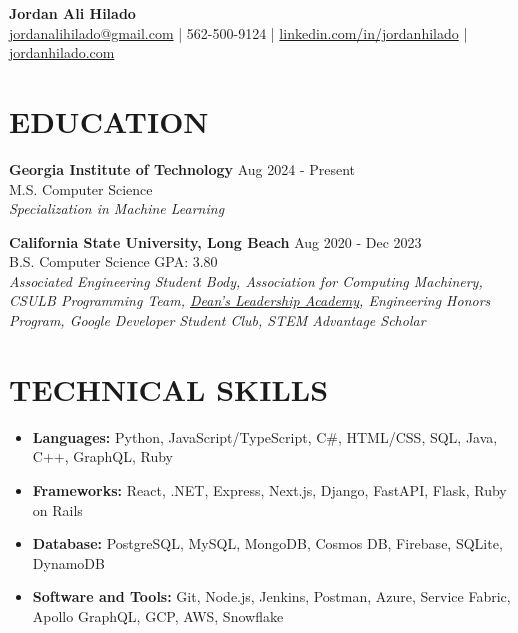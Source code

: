 \documentclass[a4paper,10pt]{extarticle}
\begin{document}
\pagestyle{empty}

\begin{center}
\textbf{\Large Jordan Ali Hilado}\\[2pt] %
\href{mailto:jordanalihilado@gmail.com}{jordanalihilado@gmail.com} | 562-500-9124 | \href{https://www.linkedin.com/in/jordanhilado}{linkedin.com/in/jordanhilado} | \href{https://jordanhilado.com/}{jordanhilado.com} %
\end{center}

\section*{EDUCATION}
\noindent
\textbf{Georgia Institute of Technology} \hfill Aug 2024 - Present\\ %
M.S. Computer Science \\
\textit{Specialization in Machine Learning} %
\vspace{1em}

\noindent
\textbf{California State University, Long Beach} \hfill Aug 2020 - Dec 2023\\ %
B.S. Computer Science \hfill GPA: 3.80\\ %
\textit{Associated Engineering Student Body, Association for Computing Machinery, CSULB Programming Team, \href{https://www.csulb.edu/college-of-engineering/aerospace-corporation-leadership-academy}{Dean’s Leadership Academy}, Engineering Honors Program, Google Developer Student Club, STEM Advantage Scholar} %

\section*{TECHNICAL SKILLS}
\begin{itemize}
    \item \textbf{Languages:} Python, JavaScript/TypeScript, C\#, HTML/CSS, SQL, Java, C++, GraphQL, Ruby %
    \item \textbf{Frameworks:} React, .NET, Express, Next.js, Django, FastAPI, Flask, Ruby on Rails %
    \item \textbf{Database:} PostgreSQL, MySQL, MongoDB, Cosmos DB, Firebase, SQLite, DynamoDB %
    \item \textbf{Software and Tools:} Git, Node.js, Jenkins, Postman, Azure, Service Fabric, Apollo GraphQL, GCP, AWS, Snowflake %
\end{itemize}
\end{document}

